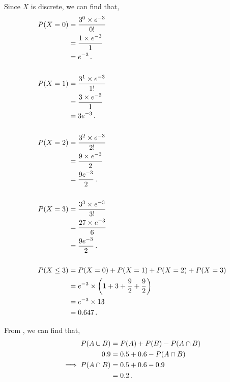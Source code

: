 \begin{subquestions}
\begin{subsubquestions}
Since $X$ is discrete, we can find that,
\begin{align}
	P(X = 0) & = \frac{ 3 ^ 0 \times e^{-3}}{0!} \nonumber \\
	         & = \frac{ 1 \times e^{-3}}{1} \nonumber \\
	         & = e^{-3} \,. \\ \nonumber \\
	P(X = 1) & = \frac{ 3 ^ 1 \times e^{-3}}{1!} \nonumber \\
			 & = \frac{ 3 \times e^{-3}}{1} \nonumber \\
			 & = 3e^{-3} \,. \\ \nonumber \\
	P(X = 2) & = \frac{ 3 ^ 2 \times e^{-3}}{2!} \nonumber \\
			 & = \frac{ 9 \times e^{-3}}{2} \nonumber \\
			 & = \frac{9e^{-3}}{2} \,. \\ \nonumber \\
	P(X = 3) & = \frac{ 3 ^ 3 \times e^{-3}}{3!} \nonumber \\
		  	 & = \frac{ 27 \times e^{-3}}{6} \nonumber \\
			 & = \frac{9e^{-3}}{2} \,. \\ \nonumber \\
	P(X \leq 3) & = P(X=0)+P(X=1)+P(X=2)+P(X=3) \nonumber \\
				& = e^{-3} \times \left(1+3+\frac{9}{2}+\frac{9}{2}\right) \nonumber \\
	            & = e^{-3} \times 13 \nonumber \\
	            & = 0.647 \,.
\end{align}

\end{subsubquestions}
	

\subquestion

\begin{subsubquestions}
	
\subsubquestion

From , we can find that,
\begin{align}
	P(A \cup B) & = P(A) + P(B) - P(A \cap B) \nonumber \\
	        0.9 & = 0.5+0.6-P(A \cap B) \nonumber \\
	        \implies P(A \cap B) & = 0.5+0.6-0.9 \nonumber \\
	                             & = 0.2 \,.
\end{align}
	

\end{subsubquestions}
\end{subquestions}
